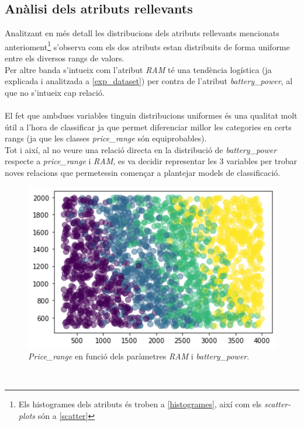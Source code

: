 \documentclass[a4paper, 11pt]{article}
\begin{document}
\subsection{Anàlisi dels atributs rellevants}\label{analisis_atributs}
Analitzant en més detall les distribucions dels atributs rellevants mencionats anterioment\footnote{Els histogrames dels atributs és troben a \textcolor{blue}{\ref{histogrames}}, així com els \textit{scatter-plots} són a \textcolor{blue}{\ref{scatter}}} s'observa com els dos atributs estan distribuits de forma uniforme entre els diversos rangs de valors.\\ Per altre banda s'intueix com l'atribut \textit{RAM} té una tendència logística (ja explicada i analitzada a \textcolor{blue}{\ref{exp_dataset}}) per contra de l'atribut \textit{battery\_power}, al que no s'intueix cap relació.\\\\
El fet que ambdues variables tinguin distribucions uniformes és una qualitat molt útil a l'hora de classificar ja que permet diferenciar millor les categories en certs rangs (ja que les classes \textit{price\_range} són equiprobables).\\
Tot i així, al no veure una relació directa en la distribució de \textit{battery\_power} respecte a \textit{price\_range} i \textit{RAM}, es va decidir representar les 3 variables per trobar noves relacions que permetessin començar a plantejar models de classificació.
\begin{figure}[h]
    \centering
    \includegraphics[width=1\textwidth]{colorines.png}
  \caption{\textit{Price\_range} en funció dels paràmetres \textit{RAM} i \textit{battery\_power}.}
  \label{fig:colores}
\end{figure}\\
\end{document}
